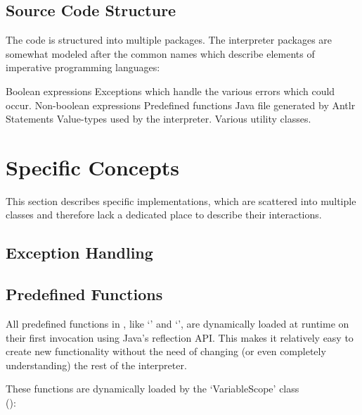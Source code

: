 \subsection{Source Code Structure}\label{srcStructure}

The code is structured into multiple packages. The interpreter packages are somewhat modeled after the common names which describe elements of imperative programming languages:

\begin{itemize}
			{Boolean expressions}
			{Exceptions which handle the various errors which could occur.}
			{Non-boolean expressions}
			{Predefined functions}
			{Java file generated by Antlr}
			{Statements}
			{Value-types used by the interpreter.}
			{Various utility classes.}
\end{itemize}

\section{Specific Concepts}\label{specificConcepts}

This section describes specific implementations, which are scattered into multiple classes and therefore lack a dedicated place to describe their interactions.

\subsection{Exception Handling}


\subsection{Predefined Functions}

All predefined functions in \setlX{}, like `' and `', are dynamically loaded at runtime on their first invocation using Java's reflection API. This makes it relatively easy to create new functionality without the need of changing (or even completely understanding) the rest of the interpreter.

These functions are dynamically loaded by the `VariableScope' class\\ ():

